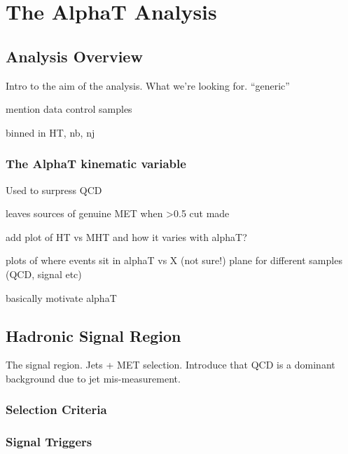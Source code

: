 \chapter{The AlphaT Analysis}

\ifpdf
    \graphicspath{{Chapter5/Figs/Raster/}{Chapter5/Figs/PDF/}{Chapter5/Figs/}}
\else
    \graphicspath{{Chapter5/Figs/Vector/}{Chapter5/Figs/}}
\fi


\section{Analysis Overview}  %
\label{sec:selection_analysis_overview}

Intro to the aim of the analysis. What we're looking for. ``generic''

mention data control samples

binned in HT, nb, nj

\subsection{The AlphaT kinematic variable}
Used to surpress QCD

leaves sources of genuine MET when >0.5 cut made

add plot of HT vs MHT and how it varies with alphaT?

plots of where events sit in alphaT vs X (not sure!) plane for different samples (QCD, signal etc)

basically motivate alphaT

\section{Hadronic Signal Region}
\label{sec:selection_hadronic}
The signal region. Jets + MET selection.
Introduce that QCD is a dominant background due to jet mis-measurement.

\subsection{Selection Criteria}

\subsection{Signal Triggers}

